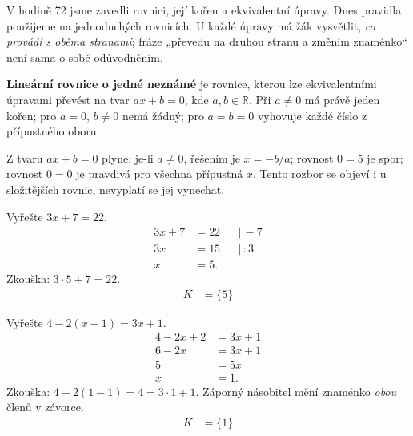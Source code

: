 \documentclass[11pt,a4paper]{article}
\begin{document}
V hodině 72 jsme zavedli rovnici, její kořen a ekvivalentní úpravy. Dnes pravidla použijeme na jednoduchých rovnicích. U každé úpravy má žák vysvětlit, \emph{co provádí s oběma stranami}; fráze „převedu na druhou stranu a změním znaménko“ není sama o sobě odůvodněním.
\begin{definiceBox}[title={Definice - Lineární rovnice}]
\textbf{Lineární rovnice o jedné neznámé} je rovnice, kterou lze ekvivalentními úpravami převést na tvar $ax+b=0$, kde $a,b\in\mathbb R$. Při $a\ne0$ má právě jeden kořen; pro $a=0$, $b\ne0$ nemá žádný; pro $a=b=0$ vyhovuje každé číslo z přípustného oboru.
\end{definiceBox}
Z tvaru $ax+b=0$ plyne: je-li $a\ne0$, řešením je $x=-b/a$; rovnost $0=5$ je spor; rovnost $0=0$ je pravdivá pro všechna přípustná $x$. Tento rozbor se objeví i u složitějších rovnic, nevyplatí se jej vynechat.
\begin{prikladReseniBox}[title={Příklad 1}]
Vyřešte $3x+7=22$.
\tcblower
\[
\begin{aligned}
3x+7&=22 &&\big|\,-7\\
3x&=15 &&\big|\,:3\\
x&=5.
\end{aligned}
\]
Zkouška: $3\cdot5+7=22$.
\[
\begin{aligned}
K &= \{5\}
\end{aligned}
\]
\end{prikladReseniBox}
\begin{prikladReseniBox}[title={Příklad 2}]
Vyřešte $4-2(x-1)=3x+1$.
\tcblower
\[
\begin{aligned}
4-2x+2&=3x+1\\
6-2x&=3x+1\\
5&=5x\\
x&=1.
\end{aligned}
\]
Zkouška: $4-2(1-1)=4=3\cdot1+1$. Záporný násobitel mění znaménko \emph{obou} členů v závorce.
\[
\begin{aligned}
K &= \{1\}
\end{aligned}
\]
\end{prikladReseniBox}
\end{document}
